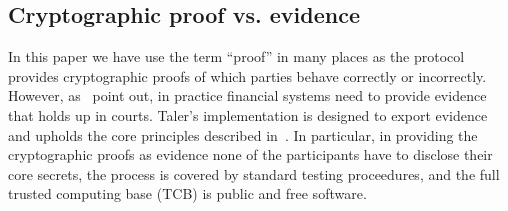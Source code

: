 \documentclass{llncs}
\begin{document}
%
%

\subsection{Cryptographic proof vs. evidence}

In this paper we have use the term ``proof'' in many places as the
protocol provides cryptographic proofs of which parties behave
correctly or incorrectly. However, as~\cite{fc2014murdoch} point out,
in practice financial systems need to provide evidence that holds up
in courts.  Taler's implementation is designed to export evidence and
upholds the core principles described in~\cite{fc2014murdoch}.  In
particular, in providing the cryptographic proofs as evidence none of
the participants have to disclose their core secrets, the process is
covered by standard testing proceedures, and the full trusted
computing base (TCB) is public and free software.

%


\end{document}
